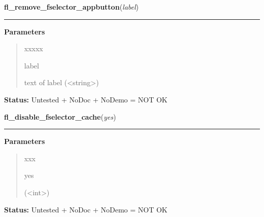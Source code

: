 \hspace{.8\funcindent}\begin{boxedminipage}{\funcwidth}

    \raggedright \textbf{fl\_remove\_fselector\_appbutton}(\textit{label})

    \vspace{-1.5ex}

    \rule{\textwidth}{0.5\fboxrule}
\setlength{\parskip}{2ex}
\setlength{\parskip}{1ex}
      \textbf{Parameters}
      \vspace{-1ex}

      \begin{quote}
        \begin{Ventry}{xxxxx}

          \item[label]

          text of label ({\textless}string{\textgreater})

        \end{Ventry}

      \end{quote}

\textbf{Status:} Untested + NoDoc + NoDemo = NOT OK



    \end{boxedminipage}

    \label{xformslib:library:fl_disable_fselector_cache}

    \vspace{0.5ex}

\hspace{.8\funcindent}\begin{boxedminipage}{\funcwidth}

    \raggedright \textbf{fl\_disable\_fselector\_cache}(\textit{yes})

    \vspace{-1.5ex}

    \rule{\textwidth}{0.5\fboxrule}
\setlength{\parskip}{2ex}
\setlength{\parskip}{1ex}
      \textbf{Parameters}
      \vspace{-1ex}

      \begin{quote}
        \begin{Ventry}{xxx}

          \item[yes]

          ({\textless}int{\textgreater})

        \end{Ventry}

      \end{quote}

\textbf{Status:} Untested + NoDoc + NoDemo = NOT OK



    \end{boxedminipage}

